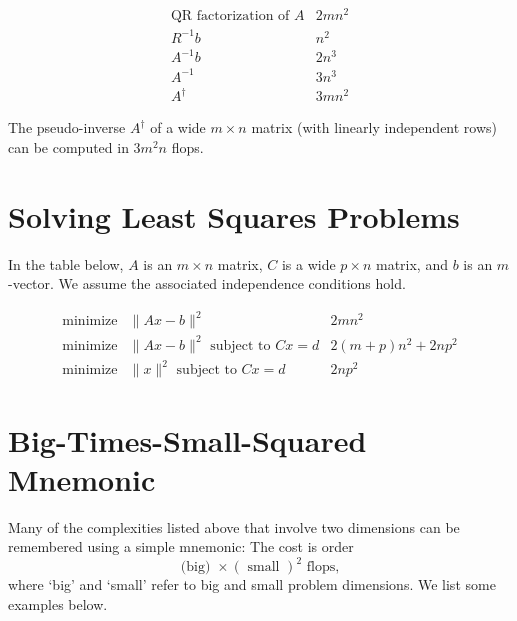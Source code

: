$$ \begin{array}{ll}\mathrm{QR} \text { factorization of } A & 2 m n^{2} \\ R^{-1} b & n^{2} \\ A^{-1} b & 2 n^{3} \\ A^{-1} & 3 n^{3} \\ A^{\dagger} & 3 m n^{2}\end{array} $$

The pseudo-inverse $ A^{\dagger} $ of a wide $ m \times n $ matrix (with linearly independent rows) can be computed in $ 3 m^{2} n $ flops.

\section{Solving Least Squares Problems}

In the table below, $ A $ is an $ m \times n $ matrix, $ C $ is a wide $ p \times n $ matrix, and $ b $ is an $ m $-vector. We assume the associated independence conditions hold.

$$ \begin{array}{lll}\operatorname{minimize} & \|A x-b\|^{2} & 2 m n^{2} \\ \operatorname { minimize } & \|A x-b\|^{2} \text { subject to } C x=d & 2(m+p) n^{2}+2 n p^{2} \\ \operatorname { minimize } &\|x\|^{2} \text { subject to } C x=d & 2 n p^{2}\end{array} $$

\section{Big-Times-Small-Squared Mnemonic}

Many of the complexities listed above that involve two dimensions can be remembered using a simple mnemonic: The cost is order
$$
\text { (big) } \times(\text { small })^{2} \text { flops, }
$$
where `big' and `small' refer to big and small problem dimensions. We list some examples below.


